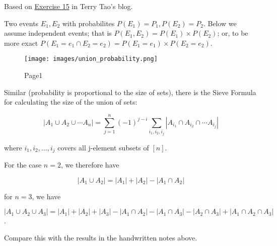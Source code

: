 

Based on
\href{https://terrytao.wordpress.com/2010/01/01/254a-notes-0-a-review-\%20\%5Bof-probability-theory/}{Exercise
15} in Terry Tao's blog.

Two events $E_1, E_2$ with probabilites $P(E_1) = P_1, P(E_2) = P_2$. Below we assume independent events; that is $P(E_1, E_2) = P(E_1) \times P(E_2)$; or, to be more exact $P(E_1=e_1 \cap E_2=e_2) = P(E_1=e_1) \times P(E_2=e_2)$.

\begin{figure}[hbt!]
\centering
\texttt{[image: images/union\_probability.png]}
\caption{Page1}
\end{figure}

Similar (probability is proportional to the size of sets), there is the Sieve Formula for calculating the size of the union of sets:

\[ |A_1 \cup A_2 \cup \cdots A_n| = \sum_{j=1}^n (-1)^{j-i} \sum_{i_1, i_2, i_j} | A_{i_1} \cap A_{i_2} \cap \cdots A_{i_j}|\]

where $i_1, i_2, \ldots , i_j$ covers all j-element subsets of $[n]$.

For the case $n=2$, we therefore have

\[ |A_1 \cup A_2| = |A_1| + |A_2| - |A_1 \cap A_2| \]

for $n=3$, we have

\[ |A_1 \cup A_2 \cup A_3 | = |A_1| + |A_2| + |A_3| - |A_1 \cap A_2| - |A_1 \cap A_3| - |A_2 \cap A_3| + |A_1 \cap A_2 \cap A_3| \].

Compare this with the results in the handwritten notes above.
